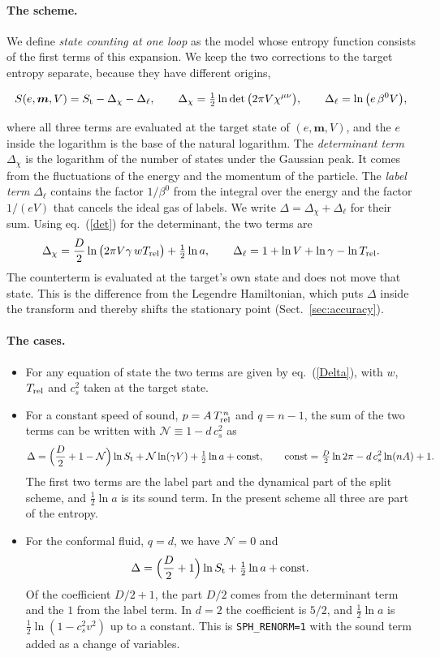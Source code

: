 \documentclass[11pt,aps,preprint,nofootinbib,superscriptaddress,tightenlines]{revtex4-2}
\def\st{\begin{equation}}
\def\stp{\end{equation}}
\def\Eq#1{eq.~(\ref{#1})}
\def\Sect#1{Sect.~\ref{#1}}
\let\oldparagraph\paragraph
\renewcommand{\paragraph}{\par\bigskip\oldparagraph}
\begin{document}
\paragraph{The scheme.}  We define \emph{state counting at one loop} as the model whose entropy function consists of the first terms of this
expansion.  We keep the two corrections to the target entropy separate, because they have different origins,
\begin{keyeq}
\st
S(e,\bm m,V)=S_{\rm t}-\Delta_\chi-\Delta_\ell,\qquad
\Delta_\chi=\tfrac12\ln\det\big(2\pi V\chi^{\mu\nu}\big),\qquad
\Delta_\ell=\ln\big(e\,\beta^0V\big) ,
\label{scheme}
\stp
\end{keyeq}
where all three terms are evaluated at the target state of $(e,\bm m,V)$, and the $e$ inside the logarithm is the base of the natural logarithm.  The
\emph{determinant term} $\Delta_\chi$ is the logarithm of the number of states under the Gaussian peak.  It comes from the fluctuations of the energy
and the momentum of the particle.  The \emph{label term} $\Delta_\ell$ contains the factor $1/\beta^0$ from the integral over the energy and the factor
$1/(eV)$ that cancels the ideal gas of labels.  We write $\Delta=\Delta_\chi+\Delta_\ell$ for their sum.  Using \Eq{det} for the determinant, the two terms are
\st
\Delta_\chi=\frac D2\ln\big(2\pi V\gamma\,wT_{\rm rel}\big)+\tfrac12\ln a,\qquad
\Delta_\ell=1+\ln V+\ln\gamma-\ln T_{\rm rel} .
\label{Delta}
\stp
The counterterm is evaluated at the target's own state and does not move that state.  This is the difference from the Legendre Hamiltonian, which
puts $\Delta$ inside the transform and thereby shifts the stationary point (\Sect{sec:accuracy}).

\paragraph{The cases.}
\begin{itemize}
\item For any equation of state the two terms are given by \Eq{Delta}, with $w$, $T_{\rm rel}$ and $c_s^2$ taken at the target state.
\item For a constant speed of sound, $p=A\,T_{\rm rel}^{\,n}$ and $q=n-1$, the sum of the two terms can be written with $\mathcal N\equiv1-d\,c_s^2$ as
  \st
  \Delta=\Big(\frac D2+1-\mathcal N\Big)\ln S_{\rm t}+\mathcal N\ln(\gamma V)+\tfrac12\ln a+\text{const},\qquad
  \text{const}=\tfrac D2\ln2\pi-d\,c_s^2\ln(nA)+1 .
  \stp
  The first two terms are the label part and the dynamical part of the split scheme, and $\tfrac12\ln a$ is its sound term.  In the present
  scheme all three are part of the entropy.
\item For the conformal fluid, $q=d$, we have $\mathcal N=0$ and
  \st
  \Delta=\Big(\frac D2+1\Big)\ln S_{\rm t}+\tfrac12\ln a+\text{const} .
  \stp
  Of the coefficient $D/2+1$, the part $D/2$ comes from the determinant term and the $1$ from the label term.  In $d=2$ the coefficient is $5/2$,
  and $\tfrac12\ln a$ is $\tfrac12\ln(1-c_s^2v^2)$ up to a constant.  This is \texttt{SPH\_RENORM=1} with the sound term added as a change of variables.
\end{itemize}
\end{document}

